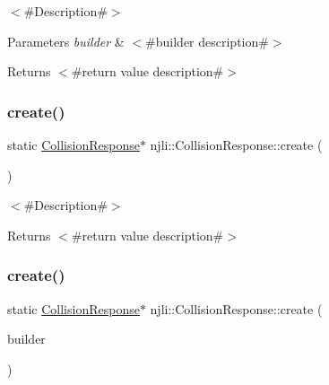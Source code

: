 $<$\#\+Description\#$>$


\begin{DoxyParams}{Parameters}
{\em builder} & $<$\#builder description\#$>$\\
\hline
\end{DoxyParams}
\begin{DoxyReturn}{Returns}
$<$\#return value description\#$>$ 
\end{DoxyReturn}
\mbox{\label{classnjli_1_1_collision_response_a1835d7480df528671d398a9f6b5b0321}} 
\subsubsection{\texorpdfstring{create()}{create()}\hspace{0.1cm}{\footnotesize\ttfamily [2/3]}}
{\footnotesize\ttfamily static \mbox{\hyperlink{classnjli_1_1_collision_response}{Collision\+Response}}$\ast$ njli\+::\+Collision\+Response\+::create (\begin{DoxyParamCaption}{ }\end{DoxyParamCaption})\hspace{0.3cm}{\ttfamily [static]}}

$<$\#\+Description\#$>$

\begin{DoxyReturn}{Returns}
$<$\#return value description\#$>$ 
\end{DoxyReturn}
\mbox{\label{classnjli_1_1_collision_response_ad83913a6368ddb7e04d73e3fb505d8d5}} 
\subsubsection{\texorpdfstring{create()}{create()}\hspace{0.1cm}{\footnotesize\ttfamily [3/3]}}
{\footnotesize\ttfamily static \mbox{\hyperlink{classnjli_1_1_collision_response}{Collision\+Response}}$\ast$ njli\+::\+Collision\+Response\+::create (\begin{DoxyParamCaption}\item[{const \mbox{\hyperlink{classnjli_1_1_collision_response_builder}{Collision\+Response\+Builder}} \&}]{builder }\end{DoxyParamCaption})\hspace{0.3cm}{\ttfamily [static]}}

